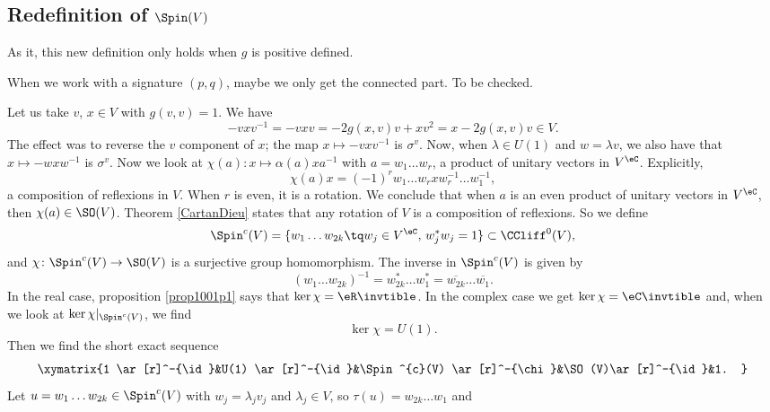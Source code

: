 

\subsection{Redefinition of \texorpdfstring{$\Spin(V)$}{Spin(V)}}

As it, this new definition only holds when $g$ is positive defined.

\begin{probleme}
	When we work with a signature $(p,q)$, maybe we only get the connected part. To be checked.
\end{probleme}

Let us take $v$, $x\in V$ with $g(v,v)=1$. We have 
\[ 
  -vxv^{-1}=-vxv=-2g(x,v)v+xv^2
		=x-2g(x,v)v\in V.
\]
The effect was to reverse the $v$ component of $x$; the map $x\mapsto -vxv^{-1}$ is $\sigma^v$. Now, when $\lambda\in U(1)$ and $w=\lambda v$, we also have that $x\mapsto -wxw^{-1}$ is $\sigma^v$. Now we look at $\chi(a)\colon x\mapsto \alpha(a)xa^{-1}$ with $a=w_{1}\ldots w_{r}$, a product of unitary vectors in $V^{\eC}$. Explicitly,
\[ 
  \chi(a)x=(-1)^{r} w_{1}\ldots w_{r}xw_{r}^{-1}\ldots w_{1}^{-1},
\]
a composition of reflexions in $V$. When $r$ is even, it is a rotation. We conclude that when $a$ is an even product of unitary vectors in $V^{\eC}$, then $\chi(a)\in \SO(V)$. Theorem \ref{CartanDieu} states that any rotation of $V$ is a composition of reflexions. So we define
\begin{equation}
\Spin^{c}(V)=\{ w_{1}\ldots w_{2k}\tq w_{j}\in V^{\eC},\,w_{j}^*w_{j}=1 \}\subset \CCliff^{0}(V),
\end{equation}
and $\chi\colon \Spin^{c}(V)\to \SO(V)$ is a surjective group homomorphism. The inverse in $\Spin^{c}(V)$ is given by
\[ 
  (w_{1}\ldots w_{2k})^{-1}=w_{2k}^*\ldots w_{1}^*=\overline{ w_{2k} }\ldots\overline{ w_{1} }.
\]
In the real case, proposition \ref{prop1001p1} says that $\ker\chi=\eR\invtible$. In the complex case we get  $\ker\chi=\eC\invtible$ and, when we look at $\ker\chi|_{\Spin^{c}(V)}$, we find
\begin{equation}
\ker\chi=U(1).
\end{equation}
Then we find the short exact sequence 
\begin{equation}
\xymatrix{%
   1 \ar[r]^-{\id}&U(1) \ar[r]^-{\id}&\Spin^{c}(V) \ar[r]^-{\chi}&\SO(V)\ar[r]^-{\id}&1.
}
\end{equation}
Let $u=w_{1}\ldots w_{2k}\in\Spin^{c}(V)$ with $w_{j}=\lambda_{j}v_{j}$ and $\lambda_{j}\in V$, so $\tau(u)=w_{2k}\ldots w_{1}$ and
